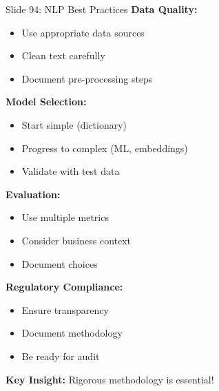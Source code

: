 \documentclass[8pt]{beamer}
\begin{document}
	\begin{frame}{Slide 94: NLP Best Practices}
		\fontsize{6.5}{7.5}\selectfont
		\textbf{Data Quality:}
		\begin{itemize}
			\item Use appropriate data sources
			\item Clean text carefully
			\item Document pre-processing steps
		\end{itemize}
		
		\vspace{0.1cm}
		\textbf{Model Selection:}
		\begin{itemize}
			\item Start simple (dictionary)
			\item Progress to complex (ML, embeddings)
			\item Validate with test data
		\end{itemize}
		
		\vspace{0.1cm}
		\textbf{Evaluation:}
		\begin{itemize}
			\item Use multiple metrics
			\item Consider business context
			\item Document choices
		\end{itemize}
		
		\vspace{0.1cm}
		\textbf{Regulatory Compliance:}
		\begin{itemize}
			\item Ensure transparency
			\item Document methodology
			\item Be ready for audit
		\end{itemize}
		
		\textcolor{myblue}{\textbf{Key Insight:}} Rigorous methodology is essential!
	\end{frame}
	
\end{document}
